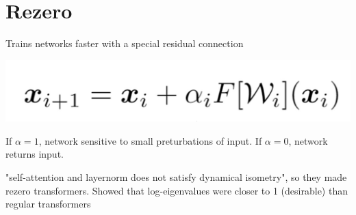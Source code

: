 \section{Rezero}

Trains networks faster with a special residual connection

\includegraphics[width=0.9\columnwidth]{images/rezero}

If $\alpha=1$, network sensitive to small preturbations of input.
If $\alpha=0$, network returns input.

"self-attention and layernorm does not satisfy dynamical isometry", so they made rezero transformers. 
Showed that log-eigenvalues were closer to 1 (desirable) than regular transformers
